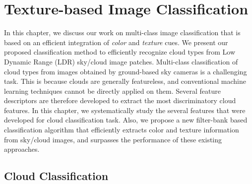 \chapter{Texture-based Image Classification}
\label{chap:classification}


In this chapter, we discuss our work on multi-class image classification that is based on an efficient integration of \emph{color} and \emph{texture} cues. We present our proposed classification method to efficiently recognize cloud types from Low Dynamic Range (LDR) sky/cloud image patches. 
Multi-class classification of cloud types from images obtained by ground-based sky cameras is a challenging task. This is because clouds are generally featureless, and conventional machine learning techniques cannot be directly applied on them. Several feature descriptors are therefore developed to extract the most discriminatory cloud features. In this chapter, we systematically study the several features that were developed for cloud classification task. Also, we propose a new filter-bank based classification algorithm that efficiently extracts color and texture information from sky/cloud images, and surpasses the performance of these existing approaches. 

\section{Cloud Classification}

